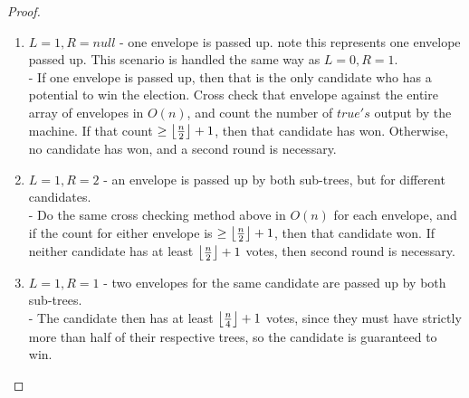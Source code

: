 \documentclass[11pt]{article}
\DeclarePairedDelimiter\floor{\lfloor}{\rfloor}
\begin{document}
\begin{proof}
\begin{enumerate}
\item $L = 1, R = null$ - one envelope is passed up. note this represents one envelope passed up. This scenario is handled the same way as $L = 0, R = 1$.\\
	- If one envelope is passed up, then that is the only candidate who has a potential to win the election. Cross check that envelope against the entire array of envelopes in $O(n)$, and count the number of $true's$ output by the machine. If that count $\geq \floor*{\frac{n}{2}} + 1$, then that candidate has won. Otherwise, no candidate has won, and a second round is necessary.
\item $L = 1, R = 2$ - an envelope is passed up by both sub-trees, but for different candidates.\\
	- Do the same cross checking method above in $O(n)$ for each envelope, and if the count for either envelope is $\geq \floor*{\frac{n}{2}} + 1$, then that candidate won. If neither candidate has at least $\floor*{\frac{n}{2}} + 1$ votes, then second round is necessary.
\item $L = 1, R = 1$ - two envelopes for the same candidate are passed up by both sub-trees.\\
	- The candidate then has at least $\floor*{\frac{n}{4}} + 1$ votes, since they must have strictly more than half of their respective trees, so the candidate is guaranteed to win.
\end{enumerate}


\end{proof}
\end{document}
